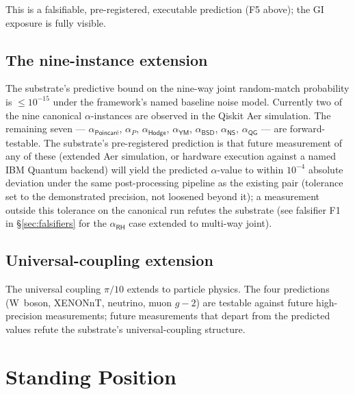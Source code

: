 \documentclass[11pt,a4paper]{amsart}
\theoremstyle{plain}
\theoremstyle{definition}
\begin{document}
This is a falsifiable, pre-registered, executable prediction (F5 above); the GI exposure is fully visible.

\subsection{The nine-instance extension}

The substrate's predictive bound on the nine-way joint random-match probability is $\le 10^{-15}$ under the framework's named baseline noise model. Currently two of the nine canonical $\alpha$-instances are observed in the Qiskit Aer simulation. The remaining seven --- $\alpha_{\textsf{Poincar\'e}}$, $\alpha_{P}$, $\alpha_{\textsf{Hodge}}$, $\alpha_{\textsf{YM}}$, $\alpha_{\textsf{BSD}}$, $\alpha_{\textsf{NS}}$, $\alpha_{\textsf{QG}}$ --- are forward-testable. The substrate's pre-registered prediction is that future measurement of any of these (extended Aer simulation, or hardware execution against a named IBM Quantum backend) will yield the predicted $\alpha$-value to within $10^{-4}$ absolute deviation under the same post-processing pipeline as the existing pair (tolerance set to the demonstrated precision, not loosened beyond it); a measurement outside this tolerance on the canonical run refutes the substrate (see falsifier F1 in \S\ref{sec:falsifiers} for the $\alpha_{\textsf{RH}}$ case extended to multi-way joint).

\subsection{Universal-coupling extension}

The universal coupling $\pi/10$ extends to particle physics. The four predictions (W~boson, XENONnT, neutrino, muon $g-2$) are testable against future high-precision measurements; future measurements that depart from the predicted values refute the substrate's universal-coupling structure.

\section{Standing Position}\label{sec:standing-position}
\end{document}
